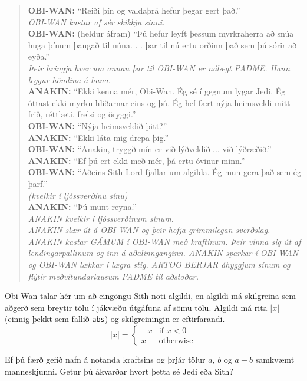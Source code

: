 \begin{quote}
    \textbf{OBI-WAN:} ``Reiði þín og valdaþrá hefur þegar gert það.''\\
    \textit{OBI-WAN kastar af sér skikkju sinni.}\\
    \textbf{OBI-WAN:} (heldur áfram) ``Þú hefur leyft þessum myrkraherra að snúa huga þínum þangað til núna. . . þar til nú ertu orðinn það sem þú sórir að eyða.''\\
    \textit{Þeir hringja hver um annan þar til OBI-WAN er nálægt PADME. Hann leggur höndina á hana.}\\
    \textbf{ANAKIN:} ``Ekki kenna mér, Obi-Wan. Ég sé í gegnum lygar Jedi. Ég óttast ekki myrku hliðarnar eins og þú. Ég hef fært nýja heimsveldi mitt frið, réttlæti, frelsi og öryggi.''\\
    \textbf{OBI-WAN:} ``Nýja heimsveldið þitt?''\\
    \textbf{ANAKIN:} ``Ekki láta mig drepa þig.''\\
    \textbf{OBI-WAN:} ``Anakin, tryggð mín er við lýðveldið ... við lýðræðið.''\\
    \textbf{ANAKIN:} ``Ef þú ert ekki með mér, þá ertu óvinur minn.''\\
    \textbf{OBI-WAN:} ``Aðeins Sith Lord fjallar um algilda. Ég mun gera það sem ég þarf.''\\
    \textit{(kveikir í ljóssverðinu sínu)}\\
    \textbf{ANAKIN:} ``Þú munt reyna.''\\
    \textit{ANAKIN kveikir í ljóssverðinum sínum.}\\
    \textit{ANAKIN slær út á OBI-WAN og þeir hefja grimmilegan sverðslag. ANAKIN kastar GÁMUM í OBI-WAN með kraftinum. Þeir vinna sig út af lendingarpallinum og inn á aðalinnganginn. ANAKIN sparkar í OBI-WAN og OBI-WAN lækkar í lægra stig. ARTOO BERJAR áhyggjum sínum og flýtir meðvitundarlausum PADME til aðstoðar.}\\
\end{quote}

Obi-Wan talar hér um að eingöngu Sith noti algildi, en algildi má skilgreina sem aðgerð sem breytir tölu í jákvæðu útgáfuna af sömu tölu.
Algildi má rita $|x|$ (einnig þekkt sem fallið \texttt{abs}) og skilgreiningin er eftirfarandi.
$$|x| = \begin{cases} -x & \text{if }x < 0\\ x & \text{otherwise}\end{cases}$$

Ef þú færð gefið nafn á notanda kraftsins og þrjár tölur $a$, $b$ og $a-b$ samkvæmt manneskjunni.
Getur þú ákvarðar hvort þetta sé Jedi eða Sith?

